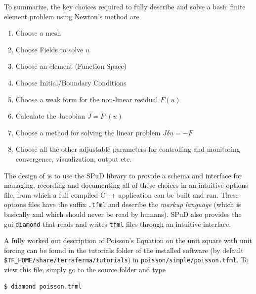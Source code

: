 To summarize,  the key choices required to fully describe and solve a
basic finite element problem using Newton's method are
\begin{enumerate}
\setlength{\itemsep}{0cm}
\item Choose a mesh
\item Choose Fields to solve $u$
\item Choose an element (Function Space)
\item Choose Initial/Boundary Conditions
\item Choose a weak form for the non-linear residual $F(u)$
\item Calculate the Jacobian $J=F'(u)$
\item Choose a method for solving the linear problem $J\delta u = -F$
\item Choose all the other adjustable parameters for controlling and
  monitoring convergence, visualization, output etc.
\end{enumerate}

The design of \TF{} is to use the SPuD library to provide a schema and interface
for managing, recording and documenting all of these choices in an
intuitive options file, from which a full compiled C++ application can
be built and run.  These options files have the suffix \texttt{.tfml}
and describe the \emph{\TF{} markup language} (which is basically xml which
should never be read by humans).  SPuD also provides the gui
\texttt{diamond} that reads and writes \texttt{tfml} files through an
intuitive interface.  

A fully worked out description of Poisson's Equation on the unit
square with unit forcing can be found in the tutorials folder of the
installed software (by default
\texttt{\${TF\_HOME}/share/terraferma/tutorials}) in
\texttt{poisson/simple/poisson.tfml}.  To view this file, simply go to
the source folder and type
\begin{lstlisting}[style=Bash]
$ diamond poisson.tfml
\end{lstlisting}

